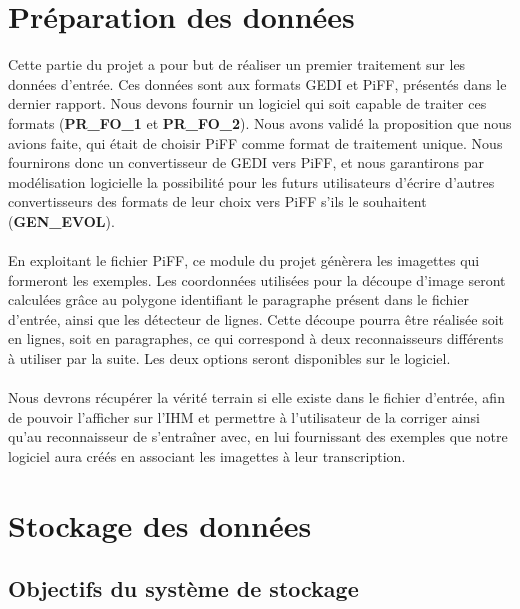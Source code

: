 \section{Préparation des données}

Cette partie du projet a pour but de réaliser un premier traitement sur les
données d’entrée. Ces données sont aux formats GEDI et PiFF, présentés dans
le dernier rapport. Nous devons fournir un logiciel qui soit capable de
traiter ces formats (\textbf{PR\_FO\_1} et \textbf{PR\_FO\_2}). Nous avons validé
la proposition que nous avions faite, qui était de choisir PiFF comme format
de traitement unique. Nous fournirons donc un convertisseur de GEDI vers PiFF,
et nous garantirons par modélisation logicielle la possibilité pour les futurs
utilisateurs d’écrire d’autres convertisseurs des formats de leur choix vers
PiFF s’ils le souhaitent (\textbf{GEN\_EVOL}).

\paragraph{}
En exploitant le fichier PiFF, ce module du projet génèrera les imagettes qui
formeront les exemples. Les coordonnées utilisées pour la découpe d’image seront
calculées grâce au polygone identifiant le paragraphe présent dans le fichier
d’entrée, ainsi que les détecteur de lignes. Cette découpe pourra être réalisée
soit en lignes, soit en paragraphes, ce qui correspond à deux reconnaisseurs
différents à utiliser par la suite. Les deux options seront
disponibles sur le logiciel.

\paragraph{}
Nous devrons récupérer la vérité terrain si elle existe dans le fichier d’entrée,
afin de pouvoir l’afficher sur l’IHM et permettre à l’utilisateur de la corriger
ainsi qu’au reconnaisseur de s’entraîner avec, en lui fournissant des exemples
que notre logiciel aura créés en associant les imagettes à leur transcription.

\section{Stockage des données}

\subsection{Objectifs du système de stockage}

